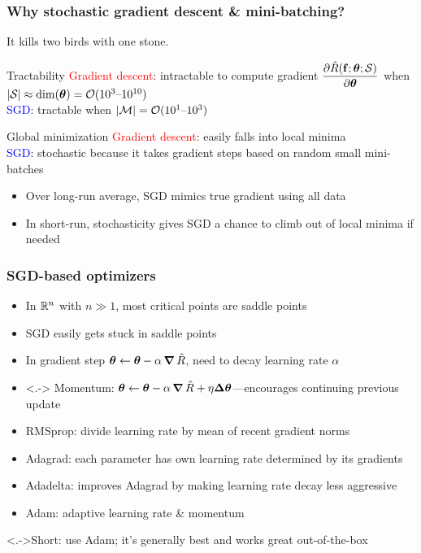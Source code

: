 \begin{frame}
    \frametitle{Why stochastic gradient descent \& mini-batching?}
    It kills two birds with one stone.

    \begin{block}{Tractability}
        \textcolor{red}{Gradient descent}: intractable to compute gradient $\dfrac{\partial \hat{R}(\mathbf{f}; \bm{\theta}; \mathcal{S})}{\partial \bm{\theta}}$ when $|\mathcal{S}| \approx \dim(\bm{\theta}) = \mathcal{O}(10^3 \text{--} 10^{10})$ \\[1ex]
        \textcolor{blue}{SGD}: tractable when $|\mathcal{M}| = \mathcal{O}(10^1 \text{--} 10^3)$
    \end{block}

    \begin{block}{Global minimization}
        \textcolor{red}{Gradient descent}: easily falls into local minima \\[1ex]
        \textcolor{blue}{SGD}: stochastic because it takes gradient steps based on random small mini-batches
        \begin{itemize}
            \item Over long-run average, SGD mimics true gradient using all data
            \item In short-run, stochasticity gives SGD a chance to climb out of local minima if needed
        \end{itemize}
    \end{block}
\end{frame}

\begin{frame}
    \frametitle{SGD-based optimizers}
    \begin{itemize}
        \item In $\mathbb{R}^n$ with $n \gg 1$, most critical points are saddle points
        \item SGD easily gets stuck in saddle points
        \item In gradient step $\bm{\theta} \leftarrow \bm{\theta} - \alpha \operatorname{\bm{\nabla}}\hat{R}$, need to decay learning rate $\alpha$
    \end{itemize}

    \begin{itemize}[<+->]
        \item<.-> Momentum: $\bm{\theta} \leftarrow \bm{\theta} - \alpha \operatorname{\bm{\nabla}}\hat{R} + \eta \mathbf{\Delta}\bm{\theta}$---encourages continuing previous update \citep{RumelhartNature86}
        \item RMSprop: divide learning rate by mean of recent gradient norms \citep{HintonRMSProp}
        \item Adagrad: each parameter has own learning rate determined by its gradients \citep{DuchJMLR11}
        \item Adadelta: improves Adagrad by making learning rate decay less aggressive \citep{Zeiler12}
        \item \alert<+->{Adam}: adaptive learning rate \& momentum \citep{KingmaICLR15}
    \end{itemize}

    \uncover<.->{Short: use Adam; it's generally best and works great out-of-the-box}
\end{frame}

